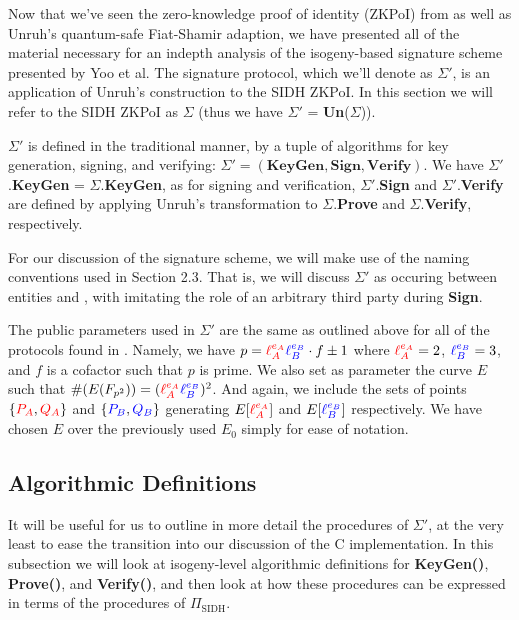 Now that we've seen the zero-knowledge proof of identity (ZKPoI) from \cite{djp} as well as Unruh's quantum-safe Fiat-Shamir adaption, we have presented all of the material necessary for an indepth analysis of the isogeny-based signature scheme presented by Yoo et al. The signature protocol, which we'll denote as $\Sigma'$, is an application of Unruh's construction to the SIDH ZKPoI. In this section we will refer to the SIDH ZKPoI as $\Sigma$ (thus we have $\Sigma'$ = \textbf{Un}($\Sigma$)).

$\Sigma'$ is defined in the traditional manner, by a tuple of algorithms for key generation, signing, and verifying: $\Sigma' = (\textbf{KeyGen}, \textbf{Sign}, \textbf{Verify})$. We have $\Sigma'$.\textbf{KeyGen} = $\Sigma$.\textbf{KeyGen}, as for signing and verification, $\Sigma'$.\textbf{Sign} and $\Sigma'$.\textbf{Verify} are defined by applying Unruh's transformation to $\Sigma$.\textbf{Prove} and $\Sigma$.\textbf{Verify}, respectively.

For our discussion of the signature scheme, we will make use of the naming conventions used in Section 2.3. That is, we will discuss $\Sigma'$ as occuring between entities \bob and \alice, with \bob imitating the role of an arbitrary third party \randall during \textbf{Sign}.

The public parameters used in $\Sigma'$ are the same as outlined above for all of the protocols found in \cite{djp}. Namely, we have $p = \textcolor{red}{\ell_{A}^{e_A}}\textcolor{blue}{\ell_{B}^{e_B}} \cdot f \pm 1$ where $\textcolor{red}{\ell_{A}^{e_A}} = 2$, $\textcolor{blue}{\ell_{B}^{e_B}} = 3$, and $f$ is a cofactor such that $p$ is prime. We also set as parameter the curve $E$ such that $\#(E(F_{p^2})) = (\textcolor{red}{\ell_{A}^{e_A}}\textcolor{blue}{\ell_{B}^{e_B}})^2$. And again, we include the sets of points $\{\textcolor{red}{P_A}, \textcolor{red}{Q_A}\}$ and $\{\textcolor{blue}{P_B}, \textcolor{blue}{Q_B}\}$ generating $E[\textcolor{red}{\ell_{A}^{e_A}}]$ and $E[\textcolor{blue}{\ell_{B}^{e_B}}]$ respectively. We have chosen $E$ over the previously used $E_0$ simply for ease of notation.

\subsection{Algorithmic Definitions}
\label{subsec:sigalgodefs}

It will be useful for us to outline in more detail the procedures of $\Sigma'$, at the very least to ease the transition into our discussion of the C implementation. In this subsection we will look at isogeny-level algorithmic definitions for \textbf{KeyGen()}, \textbf{Prove()}, and \textbf{Verify()}, and then look at how these procedures can be expressed in terms of the procedures of $\Pi_{\text{SIDH}}$.\\

